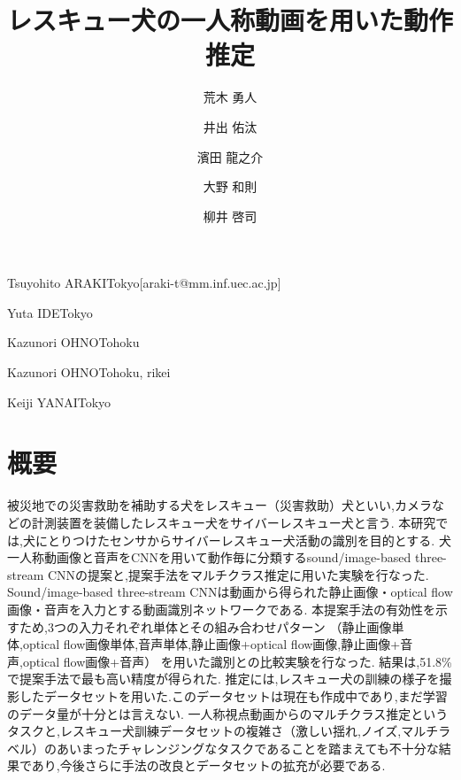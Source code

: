 \documentclass[MIRU,submit]{miru2019j}
\begin{document}
\title{レスキュー犬の一人称動画を用いた動作推定}


 \author{荒木 勇人}{Tsuyohito ARAKI}{Tokyo}[araki-t@mm.inf.uec.ac.jp]
 \author{井出 佑汰}{Yuta IDE}{Tokyo}%
 \author{濱田 龍之介}{Kazunori OHNO}{Tohoku}%
 \author{大野 和則}{Kazunori OHNO}{Tohoku, rikei}%
 \author{柳井 啓司}{Keiji YANAI}{Tokyo}%


\maketitle
\section*{概要}
被災地での災害救助を補助する犬をレスキュー（災害救助）犬といい,カメラなどの計測装置を装備したレスキュー犬をサイバーレスキュー犬と言う.
本研究では,犬にとりつけたセンサからサイバーレスキュー犬活動の識別を目的とする.
犬一人称動画像と音声をCNNを用いて動作毎に分類するsound/image-based three-stream CNNの提案と,提案手法をマルチクラス推定に用いた実験を行なった.
Sound/image-based three-stream CNNは動画から得られた静止画像・optical flow画像・音声を入力とする動画識別ネットワークである.
本提案手法の有効性を示すため,3つの入力それぞれ単体とその組み合わせパターン
（静止画像単体,optical flow画像単体,音声単体,静止画像+optical flow画像,静止画像+音声,optical flow画像+音声）
を用いた識別との比較実験を行なった.
結果は,51.8\%で提案手法で最も高い精度が得られた.
推定には,レスキュー犬の訓練の様子を撮影したデータセットを用いた.このデータセットは現在も作成中であり,まだ学習のデータ量が十分とは言えない.
一人称視点動画からのマルチクラス推定というタスクと,レスキュー犬訓練データセットの複雑さ（激しい揺れ,ノイズ,マルチラベル）のあいまったチャレンジングなタスクであることを踏まえても不十分な結果であり,今後さらに手法の改良とデータセットの拡充が必要である.
\end{document}
